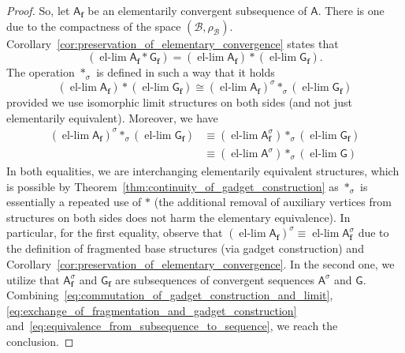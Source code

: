 \documentclass[11pt]{article}
\theoremstyle{plain}
\theoremstyle{definition}
\theoremstyle{remark}
\newcommand{\strseq}[1]{{\boldsymbol{\mathsf{#1}}}}
\DeclareMathOperator{\ellim}{el-lim}
\begin{document}
\begin{proof}
    So, let $\strseq{A}_{\bm{f}}$ be an elementarily convergent subsequence of $\strseq{A}$.
    There is one due to the compactness of the space $(\mathcal{B}, \rho_\mathcal{B})$.
    Corollary~\ref{cor:preservation_of_elementary_convergence} states that
    \begin{equation}\label{eq:commutation_of_gadget_construction_and_limit}
        (\ellim \strseq{A}_{\bm{f}} * \strseq{G}_{\bm{f}}) = (\ellim \strseq{A}_{\bm{f}}) * (\ellim \strseq{G}_{\bm{f}})
        .
    \end{equation}
    The operation $*_\sigma$ is defined in such a way that it holds
    \begin{equation}\label{eq:exchange_of_fragmentation_and_gadget_construction}
              (\ellim \strseq{A}_{\bm{f}}) * (\ellim \strseq{G}_{\bm{f}}) 
        \cong (\ellim \strseq{A}_{\bm{f}})^\sigma *_\sigma (\ellim \strseq{G}_{\bm{f}})
    \end{equation}
    provided we use isomorphic limit structures on both sides (and not just elementarily equivalent).
    Moreover, we have
    \begin{equation}\label{eq:equivalence_from_subsequence_to_sequence}
    \begin{aligned}
                (\ellim \strseq{A}_{\bm{f}})^\sigma *_\sigma (\ellim \strseq{G}_{\bm{f}})
        &\equiv (\ellim \strseq{A}_{\bm{f}}^\sigma) *_\sigma (\ellim \strseq{G}_{\bm{f}}) \\
        &\equiv (\ellim \strseq{A}^\sigma)          *_\sigma (\ellim \strseq{G})
    \end{aligned}
    \end{equation}
    In both equalities, we are interchanging elementarily equivalent structures, which is possible by Theorem~\ref{thm:continuity_of_gadget_construction} as $*_\sigma$ is essentially a repeated use of $*$ (the additional removal of auxiliary vertices from structures on both sides does not harm the elementary equivalence).
    In particular, for the first equality, observe that $(\ellim \strseq{A}_{\bm{f}})^\sigma \equiv \ellim \strseq{A}_{\bm{f}}^\sigma$ due to the definition of fragmented base structures (via gadget construction) and Corollary~\ref{cor:preservation_of_elementary_convergence}.
    In the second one, we utilize that $\strseq{A}_{\bm{f}}^\sigma$ and $\strseq{G}_{\bm{f}}$ are subsequences of convergent sequences $\strseq{A}^\sigma$ and $\strseq{G}$.
    Combining~\eqref{eq:commutation_of_gadget_construction_and_limit},\eqref{eq:exchange_of_fragmentation_and_gadget_construction} and~\eqref{eq:equivalence_from_subsequence_to_sequence}, we reach the conclusion.
\end{proof}
\end{document}
